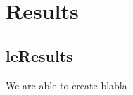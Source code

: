 \chapter{Results}\label{ch:results}

\section{leResults} \label{scresults}
We are able to create blabla